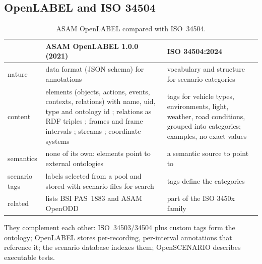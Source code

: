\documentclass[11pt,a4paper]{article}
\begin{document}
\subsection{OpenLABEL and ISO 34504}
\begin{table}[H]\centering\small
\caption{ASAM OpenLABEL compared with ISO~34504.}
\begin{tabular}{L{2.4cm}L{6.2cm}L{5.6cm}}
\toprule
& ASAM OpenLABEL 1.0.0 (2021) & ISO 34504:2024\\\midrule
nature & data format (JSON schema) for annotations \cite[standard page]{asamopenlabel} & vocabulary and structure for scenario categories \cite[web article]{tno2024}\\
content & elements (objects, actions, events, contexts, relations) with name, uid, type and ontology id \cite[Sec.~2.3.1]{openlabelconcept}; relations as RDF triples \cite[Sec.~2.3.4]{openlabelconcept}; frames and frame intervals \cite[Secs.~2.3, 2.3.2]{openlabelconcept}; streams \cite[Secs.~2.3, 2.3.6]{openlabelconcept}; coordinate systems \cite[Secs.~2.3.7, 3.1]{openlabelconcept} & tags for vehicle types, environments, light, weather, road conditions, grouped into categories; examples, no exact values \cite[web article]{tno2024}\\
semantics & none of its own: elements point to external ontologies \cite[Secs.~2.3, 2.3.3]{openlabelconcept} & a semantic source to point to\\
scenario tags & labels selected from a pool and stored with scenario files for search \cite[Secs.~5.1--5.2]{openlabelconcept} & tags define the categories\\
related & lists BSI PAS~1883 and ASAM OpenODD \cite[Sec.~1.3]{openlabelconcept} & part of the ISO 3450x family \cite[web article]{tno2024}\\
\bottomrule
\end{tabular}
\end{table}
They complement each other: ISO~34503/34504 plus custom tags form the ontology; OpenLABEL stores per-recording, per-interval annotations that reference it; the scenario database indexes them; OpenSCENARIO describes executable tests.

\end{document}
